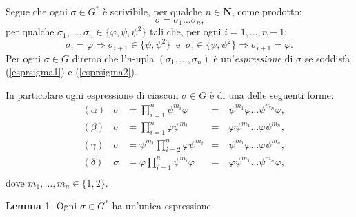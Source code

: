 \documentclass[a4paper,oneside,11pt]{book}
\theoremstyle{definition} \newtheorem{Def}{Definizione}
\theoremstyle{plain} \newtheorem{teo}{Teorema}
\theoremstyle{plain} \newtheorem{cor}[teo]{Corollario}
\theoremstyle{definition} \newtheorem{lem}[teo]{Lemma}
\theoremstyle{plain} \newtheorem{pro}[teo]{Proposizione}
\newcommand{\ug}[1]{(\ref{#1})} %
\begin{document}
	Segue che ogni $\sigma \in G^*$ è scrivibile, per qualche $n \in \mathbf{N}$, come prodotto:
	\begin{equation}\label{esprsigma1} %
		\sigma = \sigma_1 \dots \sigma_n \text{,}
	\end{equation}
	per qualche $\sigma_1, \dots, \sigma_n \in \{\varphi, \psi, \psi^2\}$ tali che, per ogni $i = 1, \dots, n-1$:
	\begin{equation}\label{esprsigma2}
		\sigma_i = \varphi \Rightarrow \sigma_{i+1} \in \{\psi, \psi^2\}\ \text{ e }\ \sigma_i \in \{\psi, \psi^2\} \Rightarrow \sigma_{i+1} = \varphi \text{.}
	\end{equation}
	Per ogni $\sigma \in G$ diremo che l'$n$-upla $(\sigma_1, \dots, \sigma_n)$ è un'\emph{espressione} di $\sigma$ se soddisfa \ug{esprsigma1} e \ug{esprsigma2}.
	
	In particolare ogni espressione di ciascun $\sigma \in G$ è di una delle seguenti forme:
	\begin{equation}\label{forph} %
	\begin{aligned}
		&(\alpha) &\sigma &= \prod_{i=1}^n  \psi^{m_i} \varphi &=\ &\psi^{m_1} \varphi \dots \psi^{m_n} \varphi \text{,}\\
		&(\beta) &\sigma &= \prod_{i=1}^n  \varphi \psi^{m_i} &=\ &\varphi \psi^{m_1} \dots \varphi \psi^{m_n} \text{,}\\
		&(\gamma) &\sigma &= \psi^{m_1} \prod_{i=2}^n  \varphi \psi^{m_i} &=\ &\psi^{m_1} \varphi \dots \varphi \psi^{m_n} \text{,}\\
		&(\delta) &\sigma &= \varphi  \prod_{i=1}^n \psi^{m_i}  \varphi &=\ &\varphi\psi^{m_1} \dots \psi^{m_n}\varphi \text{,}\\
	\end{aligned}
	\end{equation}
	dove $m_1, \dots, m_n \in \{1,2\}$.
	
	\begin{lem}\label{solo1nupla}
		Ogni $\sigma \in G^*$ ha un'unica espressione.
	\end{lem}
	
\end{document}

